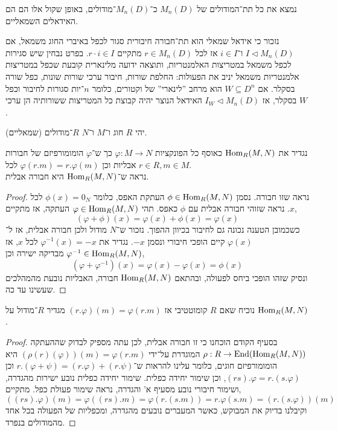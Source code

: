 \subquestion{}
נמצא את כל תת־המודולים של $M_n(D)$ כ־$M_n(D)$־מודולים, באופן שקול אלו הם הם האידאלים השמאליים.
\begin{solution}
	נזכור כי אידאל שמאלי הוא תת־חבורה חיבורית סגור לכפל באיברי החוג משמאל, אם $I \triangleleft M_n(D)$ ו־$i \in I$ אז לכל $r \in M_n(D)$ מתקיים $r \cdot i \in I$.
	בפרט נבחין שיש סגירות לכפל משמאל במטריצות האלמנטריות, ותוצאה ידועה מלינארית קובעת שכפל במטריצות אלמנטריות משמאל יניב את הפעולות: החלפת שורות, חיבור ערכי שורות שונות, כפל שורה בסקלר.
	אם $W \subseteq D^n$ הוא מרחב ''לינארי'' של וקטורים, כלומר $n$־יות סגורות לחיבור וכפל בסקלר, אז $I_W \triangleleft M_n(D)$ האידאל הנוצר יהיה קבוצת כל המטריצות ששורותיה הן ערכי $W$.
\end{solution}

\question{}
יהי $R$ חוג ו־$M$ ו־$N$ $R$־מודולים (שמאליים).

\subquestion{}
נגדיר את $\operatorname{Hom}_R(M, N)$ כאוסף כל הפונקציות $\varphi : M \to N$ כך ש־$\varphi$ הומומורפיזם של חבורות אבליות וכן $\varphi(r . m) = r . \varphi(m)$ לכל $r \in R, m \in M$. \\
נראה ש־$\operatorname{Hom}_R(M, N)$ היא חבורה אבלית.
\begin{proof}
	נראה שזו חבורה.
	נסמן $\phi \in \operatorname{Hom}_R(M, N)$ העתקת האפס, כלומר $\phi(x) = 0_N$ לכל $x$.
	נראה שזוהי חבורה אבלית עם $\phi$ כאפס.
	תהי $\varphi \in \operatorname{Hom}_R(M, N)$ העתקה, אז מתקיים,
	\[
		(\varphi + \phi)(x)
		= \varphi(x) + \phi(x)
		= \varphi(x)
	\]
	כשכמובן הטענה נכונה גם לחיבור בכיוון ההפוך.
	נזכור ש־$N$ מודול ולכן חבורה אבלית, אז ל־$\varphi(x)$ קיים הופכי חיבורי ונסמן $-x$.
	נגדיר את $\varphi^{-1}(x) = -x$ לכל $x$, אז $\varphi^{-1} \in \operatorname{Hom}_R(M, N)$ מבדיקה ישירה וכן,
	\[
		(\varphi + \varphi^{-1})(x)
		= \varphi(x) - \varphi(x)
		= \phi(x)
	\]
	ונסיק שזהו הופכי ביחס לפעולה, ובהתאם $\operatorname{Hom}_R(M, N)$ חבורה, האבליות נובעת מהמהלכים שעשינו עד כה.
\end{proof}

\subquestion{}
נוכיח שאם $R$ קומוטטיבי אז $(r . \varphi)(m) = \varphi(r . m)$ מגדיר $R$־מודול על $\operatorname{Hom}_R(M, N)$.
\begin{proof}
	בסעיף הקודם הוכחנו כי זו חבורה אבלית, לכן עתה מספיק לבדוק שההעתקה $\rho : R \to \operatorname{End}(\operatorname{Hom}_R(M, N))$ המוגדרת על־ידי $(\rho(r)(\varphi))(m) = \varphi(r . m)$ היא הומומורפיזם חוגים,
	כלומר עלינו להראות ש־$r . (\varphi + \psi) = (r . \varphi) + (r . \psi)$ וכן $(r s) . \varphi = r . (s . \varphi)$, וכן שימור יחידה כפלית.
	שימור יחידה כפלית נובע ישירות מהגדרה, ושימור חיבורי נובע מסעיף א' והגדרה, נראה שימור פעולת כפל.
	מתקיים,
	\[
		((r s) . \varphi)(m)
		= \varphi((r s) . m)
		= \varphi(r . (s . m))
		= r . \varphi(s . m)
		= (r . (s . \varphi))(m)
	\]
	וקיבלנו בדיוק את המבוקש, כאשר המעברים נובעים מהגדרה, ומכפליות של הפעולה בכל אחד מהמודולים בנפרד.
\end{proof}

